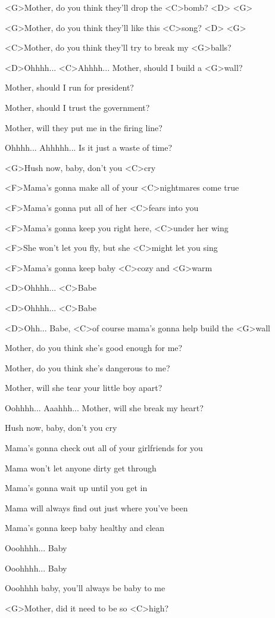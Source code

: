 
\zs
<G>Mother, do you think they'll drop the <C>bomb? <D> <G>

<G>Mother, do you think they'll like this <C>song? <D> <G>

<C>Mother, do you think they'll try to break my <G>balls?

<D>Ohhhh... <C>Ahhhh... Mother, should I build a <G>wall?
\ks

\zs
Mother, should I run for president?

Mother, should I trust the government?

Mother, will they put me in the firing line?

Ohhhh... Ahhhhh... Is it just a waste of time?
\ks

\zr
<G>Hush now, baby, don't you <C>cry

<F>Mama's gonna make all of your <C>nightmares come true

<F>Mama's gonna put all of her <C>fears into you

<F>Mama's gonna keep you right here, <C>under her wing

<F>She won't let you fly, but she <C>might let you sing

<F>Mama's gonna keep baby <C>cozy and <G>warm

<D>Ohhhh... <C>Babe

<D>Ohhhh... <C>Babe

<D>Ohh... Babe, <C>of course mama's gonna help build the <G>wall
\kr

\zs
Mother, do you think she's good enough for me?

Mother, do you think she's dangerous to me?

Mother, will she tear your little boy apart?

Oohhhh... Aaahhh... Mother, will she break my heart?
\ks

\zr
Hush now, baby, don't you cry

Mama's gonna check out all of your girlfriends for you

Mama won't let anyone dirty get through

Mama's gonna wait up until you get in

Mama will always find out just where you've been

Mama's gonna keep baby healthy and clean

Ooohhhh... Baby

Ooohhhh... Baby

Ooohhhh baby, you'll always be baby to me

<G>Mother, did it need to be so <C>high?
\kr

\kp
